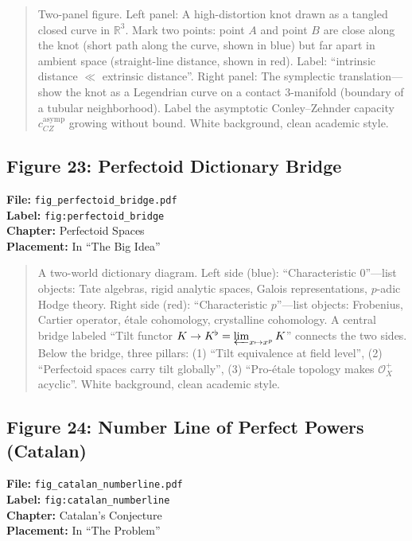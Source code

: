 \begin{quote}
Two-panel figure. Left panel: A high-distortion knot drawn as a tangled closed curve in $\mathbb{R}^3$. Mark two points: point $A$ and point $B$ are close along the knot (short path along the curve, shown in blue) but far apart in ambient space (straight-line distance, shown in red). Label: ``intrinsic distance $\ll$ extrinsic distance''. Right panel: The symplectic translation---show the knot as a Legendrian curve on a contact 3-manifold (boundary of a tubular neighborhood). Label the asymptotic Conley--Zehnder capacity $c_{CZ}^{\text{asymp}}$ growing without bound. White background, clean academic style.
\end{quote}

\subsection*{Figure 23: Perfectoid Dictionary Bridge}
\textbf{File:} \texttt{fig\_perfectoid\_bridge.pdf} \\
\textbf{Label:} \texttt{fig:perfectoid\_bridge} \\
\textbf{Chapter:} Perfectoid Spaces \\
\textbf{Placement:} In ``The Big Idea''

\begin{quote}
A two-world dictionary diagram. Left side (blue): ``Characteristic 0''---list objects: Tate algebras, rigid analytic spaces, Galois representations, $p$-adic Hodge theory. Right side (red): ``Characteristic $p$''---list objects: Frobenius, Cartier operator, \'etale cohomology, crystalline cohomology. A central bridge labeled ``Tilt functor $K \to K^\flat = \varprojlim_{x \mapsto x^p} K$'' connects the two sides. Below the bridge, three pillars: (1) ``Tilt equivalence at field level'', (2) ``Perfectoid spaces carry tilt globally'', (3) ``Pro-\'etale topology makes $\mathcal{O}_X^+$ acyclic''. White background, clean academic style.
\end{quote}

\subsection*{Figure 24: Number Line of Perfect Powers (Catalan)}
\textbf{File:} \texttt{fig\_catalan\_numberline.pdf} \\
\textbf{Label:} \texttt{fig:catalan\_numberline} \\
\textbf{Chapter:} Catalan's Conjecture \\
\textbf{Placement:} In ``The Problem''

